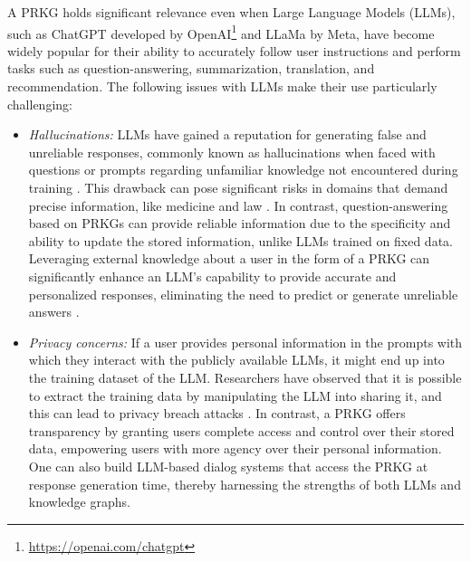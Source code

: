 \documentclass[11pt,pdftex]{article}
\begin{document}
A PRKG holds significant relevance even when Large Language Models (LLMs), such as ChatGPT developed by OpenAI\footnote{\url{https://openai.com/chatgpt}} and LLaMa by Meta\cite{touvron2023llama}, have become widely popular for their ability to accurately follow user instructions and perform tasks such as question-answering, summarization, translation, and recommendation. The following issues with LLMs make their use particularly challenging:
\begin{itemize}
    \item \textit{Hallucinations:} LLMs have gained a reputation for generating false and unreliable responses, commonly known as hallucinations when faced with questions or prompts regarding unfamiliar knowledge not encountered during training \cite{ji2023surveyHallucination}. This drawback can pose significant risks in domains that demand precise information, like medicine \cite{beutel2023artificial} and law \cite{sun2023short}. In contrast, question-answering based on PRKGs can provide reliable information due to the specificity and ability to update the stored information, unlike LLMs trained on fixed data. Leveraging external knowledge about a user in the form of a PRKG can significantly enhance an LLM's capability to provide accurate and personalized responses, eliminating the need to predict or generate unreliable answers  \cite{peng2023check}. 

    \item \textit{Privacy concerns:} If a user provides personal information in the prompts with which they interact with the publicly available LLMs, it might end up into the training dataset of the LLM. Researchers have observed that it is possible to extract the training data by manipulating the LLM into sharing it, and this can lead to privacy breach attacks \cite{carlini2021extracting, nasr2023scalable}. 
    In contrast, a PRKG  offers transparency by granting users complete access and control over their stored data, empowering users with more agency over their personal information. One can also build LLM-based dialog systems that access the PRKG at response generation time, thereby harnessing the strengths of both LLMs and knowledge graphs.
\end{itemize} 
\end{document}
